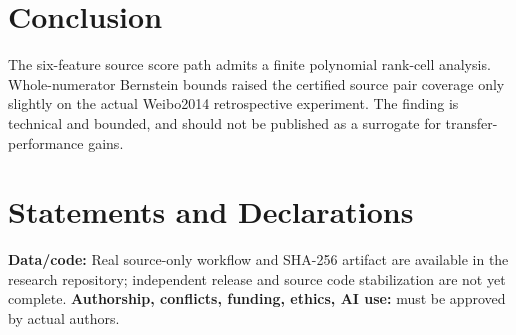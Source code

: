 \documentclass[11pt,a4paper]{article}
\begin{document}
\section{Conclusion}
The six-feature source score path admits
a finite polynomial rank-cell analysis.
Whole-numerator Bernstein bounds
raised the certified source pair coverage
only slightly on the actual Weibo2014
retrospective experiment. The finding
is technical and bounded, and should
not be published as a surrogate
for transfer-performance gains.

\section*{Statements and Declarations}
\textbf{Data/code:} Real source-only
workflow and SHA-256 artifact are
available in the research repository;
independent release and source code
stabilization are not yet complete.
\textbf{Authorship, conflicts,
funding, ethics, AI use:} must be
approved by actual authors.


\end{document}
